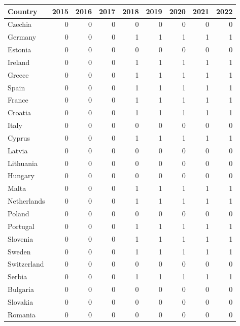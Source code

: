 \begin{tabular}{lrrrrrrrr}
\toprule
Country & 2015 & 2016 & 2017 & 2018 & 2019 & 2020 & 2021 & 2022 \\
\midrule
Czechia & 0 & 0 & 0 & 0 & 0 & 0 & 0 & 0 \\
Germany & 0 & 0 & 0 & 1 & 1 & 1 & 1 & 1 \\
Estonia & 0 & 0 & 0 & 0 & 0 & 0 & 0 & 0 \\
Ireland & 0 & 0 & 0 & 1 & 1 & 1 & 1 & 1 \\
Greece & 0 & 0 & 0 & 1 & 1 & 1 & 1 & 1 \\
Spain & 0 & 0 & 0 & 1 & 1 & 1 & 1 & 1 \\
France & 0 & 0 & 0 & 1 & 1 & 1 & 1 & 1 \\
Croatia & 0 & 0 & 0 & 1 & 1 & 1 & 1 & 1 \\
Italy & 0 & 0 & 0 & 0 & 0 & 0 & 0 & 0 \\
Cyprus & 0 & 0 & 0 & 1 & 1 & 1 & 1 & 1 \\
Latvia & 0 & 0 & 0 & 0 & 0 & 0 & 0 & 0 \\
Lithuania & 0 & 0 & 0 & 0 & 0 & 0 & 0 & 0 \\
Hungary & 0 & 0 & 0 & 0 & 0 & 0 & 0 & 0 \\
Malta & 0 & 0 & 0 & 1 & 1 & 1 & 1 & 1 \\
Netherlands & 0 & 0 & 0 & 1 & 1 & 1 & 1 & 1 \\
Poland & 0 & 0 & 0 & 0 & 0 & 0 & 0 & 0 \\
Portugal & 0 & 0 & 0 & 1 & 1 & 1 & 1 & 1 \\
Slovenia & 0 & 0 & 0 & 1 & 1 & 1 & 1 & 1 \\
Sweden & 0 & 0 & 0 & 1 & 1 & 1 & 1 & 1 \\
Switzerland & 0 & 0 & 0 & 0 & 0 & 0 & 0 & 0 \\
Serbia & 0 & 0 & 0 & 1 & 1 & 1 & 1 & 1 \\
Bulgaria & 0 & 0 & 0 & 0 & 0 & 0 & 0 & 0 \\
Slovakia & 0 & 0 & 0 & 0 & 0 & 0 & 0 & 0 \\
Romania & 0 & 0 & 0 & 0 & 0 & 0 & 0 & 0 \\
\bottomrule
\end{tabular}

